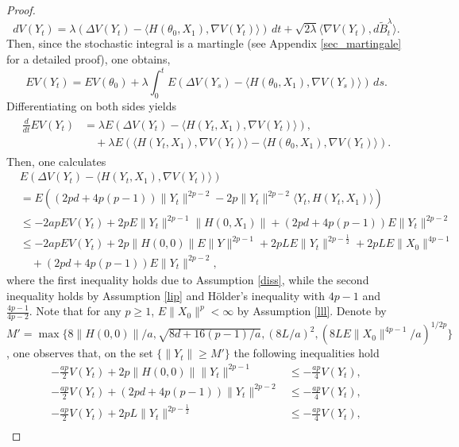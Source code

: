 \documentclass[a4paper]{article}
\begin{document}
\begin{proof}
\[
d V(Y_t) = \lambda \left(\Delta V(Y_t)  - \langle H(\theta_0, X_1), \nabla V(Y_t)\rangle \right) \,dt + \sqrt{2\lambda} \langle \nabla V(Y_t), d \tilde{B}^{\lambda}_t \rangle.
\]
Then, since the stochastic integral is a martingle (see Appendix \ref{sec_martingale} for a detailed proof), one obtains,
\[
E V(Y_t) = EV(\theta_0)+ \lambda \int_0^t E\left(\Delta V(Y_s)  - \langle H(\theta_0, X_1), \nabla V(Y_s)\rangle \right)  \,ds.
\]
Differentiating on both sides yields
\begin{align}
\begin{split}\label{es1}
\frac{d}{dt} E V(Y_t)	& = \lambda  E\left(\Delta V(Y_t)  - \langle H(Y_t, X_1), \nabla V(Y_t)\rangle \right) ,\\
			& \hspace{1em} +\lambda  E\left(\langle H(Y_t, X_1), \nabla V(Y_t)\rangle  - \langle H(\theta_0, X_1), \nabla V(Y_t)\rangle \right).
			\end{split}
\end{align}
Then, one calculates
\begin{align*}
&  E\left(\Delta V(Y_t)  - \langle H(Y_t, X_1), \nabla V(Y_t)\rangle \right) \\
  				& =   E \left((2pd+4p(p-1))\|Y_t\|^{2p-2}-2p\|Y_t\|^{2p-2} \langle Y_t, H(Y_t,X_1) \rangle\right)\\
  				& \leq -2ap EV(Y_t)+2pE\|Y_t\|^{2p-1}\|H(0,X_1)\| + (2pd+4p(p-1))E\|Y_t\|^{2p-2}\\
  				& \leq -2ap EV(Y_t) +2p\|H(0,0)\| E\|Y\|^{2p-1}+2pL E\|Y_t\|^{2p-\frac{1}{2}}+2pL E\|X_0\|^{4p-1}\\
  				&\hspace{1em} + (2pd+4p(p-1))E\|Y_t\|^{2p-2},
\end{align*}
where the first inequality holds due to Assumption \ref{diss}, while the second inequality holds by Assumption \ref{lip} and H\"{o}lder's inequality with $4p-1$ and $\frac{4p-1}{4p-2}$. Note that for any $p \geq 1$, $E\|X_0\|^p<\infty$ by Assumption \ref{lll}. Denote by $M' = \max\{8\|H(0,0)\|/a, \sqrt{8d+16(p-1)/a}, (8L/a)^2, (8L E\|X_0\|^{4p-1}/a)^{1/2p}\}$, one observes that, on the set $\{\|Y_t\| \geq M'\}$ the following inequalities hold
\begin{align*}
-\frac{ap}{2}V(Y_t) +2p\|H(0,0)\| \|Y_t\|^{2p-1} 		&\leq -\frac{ap}{4}V(Y_t),\\
-\frac{ap}{2}V(Y_t) + (2pd+4p(p-1)) \|Y_t\|^{2p-2}	& \leq -\frac{ap}{4}V(Y_t),\\
-\frac{ap}{2}V(Y_t) +2pL \|Y_t\|^{2p-\frac{1}{2}}	& \leq -\frac{ap}{4}V(Y_t),\\

\end{align*}
\end{proof}
\end{document}
